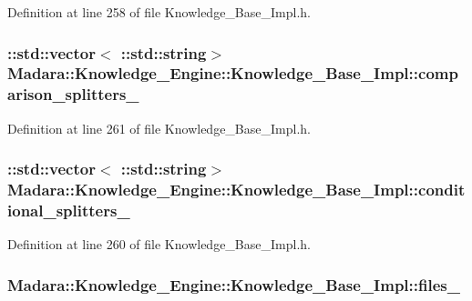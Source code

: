 Definition at line 258 of file Knowledge\_\-Base\_\-Impl.h.

\hypertarget{classMadara_1_1Knowledge__Engine_1_1Knowledge__Base__Impl_a6d39ebcadcabca6ebdcacd09f557e98e}{
\subsubsection[{comparison\_\-splitters\_\-}]{\setlength{\rightskip}{0pt plus 5cm}::std::vector$<$ ::std::string$>$ {\bf Madara::Knowledge\_\-Engine::Knowledge\_\-Base\_\-Impl::comparison\_\-splitters\_\-}}}
\label{d3/d3c/classMadara_1_1Knowledge__Engine_1_1Knowledge__Base__Impl_a6d39ebcadcabca6ebdcacd09f557e98e}


Definition at line 261 of file Knowledge\_\-Base\_\-Impl.h.

\hypertarget{classMadara_1_1Knowledge__Engine_1_1Knowledge__Base__Impl_aba1605420ef07946f5336ec8f2c0a69f}{
\subsubsection[{conditional\_\-splitters\_\-}]{\setlength{\rightskip}{0pt plus 5cm}::std::vector$<$ ::std::string$>$ {\bf Madara::Knowledge\_\-Engine::Knowledge\_\-Base\_\-Impl::conditional\_\-splitters\_\-}}}
\label{d3/d3c/classMadara_1_1Knowledge__Engine_1_1Knowledge__Base__Impl_aba1605420ef07946f5336ec8f2c0a69f}


Definition at line 260 of file Knowledge\_\-Base\_\-Impl.h.

\hypertarget{classMadara_1_1Knowledge__Engine_1_1Knowledge__Base__Impl_aebb2bed99ac68af8ca0cd476d73ae485}{
\subsubsection[{files\_\-}]{ {\bf Madara::Knowledge\_\-Engine::Knowledge\_\-Base\_\-Impl::files\_\-}}}
\label{d3/d3c/classMadara_1_1Knowledge__Engine_1_1Knowledge__Base__Impl_aebb2bed99ac68af8ca0cd476d73ae485}


